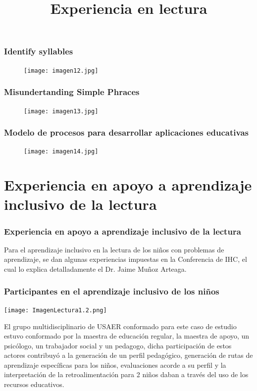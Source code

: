 \documentclass[11pt]{beamer}
\begin{document}
\begin{frame}
\frametitle{Identify syllables}
    \begin{figure}
    \centering
     \texttt{[image: imagen12.jpg]}
    \end{figure}
\end{frame}

\begin{frame}
\frametitle{Misundertanding Simple Phraces}
    \begin{figure}
    \centering
     \texttt{[image: imagen13.jpg]}
    \end{figure}
\end{frame}

\begin{frame}
\frametitle{Modelo de procesos para desarrollar aplicaciones educativas}
    \begin{figure}
    \centering
     \texttt{[image: imagen14.jpg]}
    \end{figure}
\end{frame}


\section{Experiencia en apoyo a aprendizaje inclusivo de la lectura}
\title{Experiencia en lectura}
\begin{frame}
\frametitle{Experiencia en apoyo a aprendizaje inclusivo de la lectura}
    \justify
    Para el aprendizaje inclusivo en la lectura de los niños con problemas de aprendizaje, se dan algunas experiencias impuestas en la Conferencia de IHC, el cual lo explica detalladamente el Dr. Jaime Muñoz Arteaga.
\end{frame}

\begin{frame}
\frametitle{Participantes en el aprendizaje inclusivo de los niños}
    \justify
    \begin{minipage}[c]{0.4\textwidth} 
    \texttt{[image: ImagenLectura1.2.png]} 
    \end{minipage}
    \begin{minipage}[c]{0.55\textwidth}
        El grupo multidisciplinario de USAER conformado para este caso de estudio estuvo conformado por la maestra de educación regular, la maestra de apoyo, un psicólogo, un trabajador social y un pedagogo, dicha participación de estos actores contribuyó a la generación de un perfil pedagógico, generación de rutas de aprendizaje específicas para los niños, evaluaciones acorde a su  perfil y la interpretación de la retroalimentación para 2 niños daban a través del uso de los recursos educativos.
    \end{minipage}
\end{frame}
\end{document}
